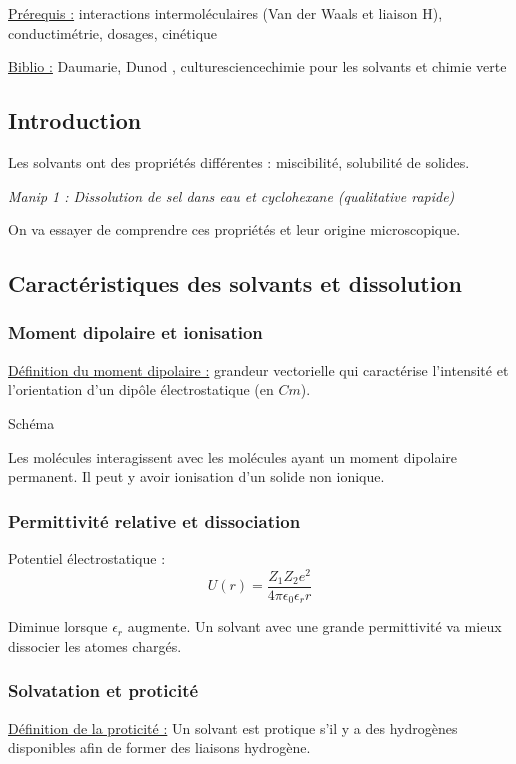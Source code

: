 \documentclass{article}%
\begin{document}
\underline{Prérequis :} interactions intermoléculaires (Van der Waals et liaison H), conductimétrie, dosages, cinétique

\underline{Biblio :} Daumarie, Dunod , culturesciencechimie pour les solvants et chimie verte

\subsection{Introduction}

Les solvants ont des propriétés différentes : miscibilité, solubilité de solides.

\textit{Manip 1 : Dissolution de sel dans eau et cyclohexane (qualitative rapide)}

On va essayer de comprendre ces propriétés et leur origine microscopique.

\subsection{Caractéristiques des solvants et dissolution}
\subsubsection{Moment dipolaire et ionisation}

\underline{Définition du moment dipolaire :}  grandeur vectorielle qui caractérise l'intensité et l'orientation d'un dipôle électrostatique (en $C m$).

Schéma

Les molécules interagissent avec les molécules ayant un moment dipolaire permanent. Il peut y avoir ionisation d'un solide non ionique.

\subsubsection{Permittivité relative et dissociation}

Potentiel électrostatique : \[U(r)=\frac{Z_1 Z_2 e^2}{4 \pi \epsilon_0 \epsilon_r r}\]

Diminue lorsque $\epsilon_r$ augmente. Un solvant avec une grande permittivité va mieux dissocier les atomes chargés.

\subsubsection{Solvatation et proticité}

\underline{Définition de la proticité :} Un solvant est protique s'il y a des hydrogènes disponibles afin de former des liaisons hydrogène.
\end{document}

